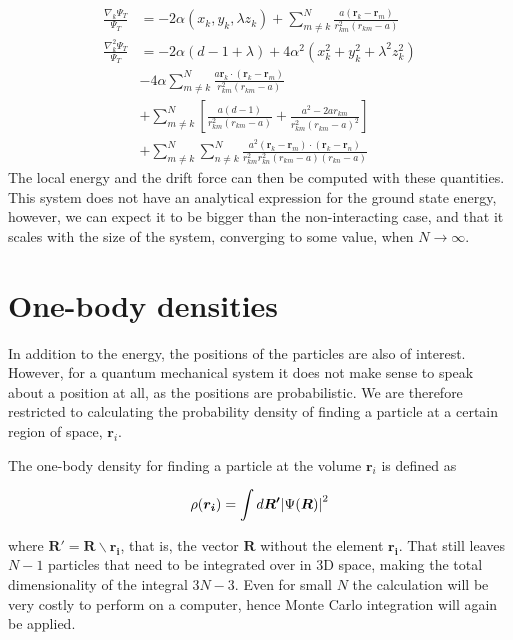 \documentclass[aps,reprint,superscriptaddress,nofootinbib]{revtex4-2}
\begin{document}
    \begin{align*}
        \frac{\nabla_k \Psi_T}{\Psi_T} &= -2 \alpha (x_k, y_k, \lambda z_k) + \sum_{m \neq k}^N \frac{a(\bm r_k - \bm r_m)}{r_{km}^2 (r_{km} - a)} \\
        \frac{\nabla_k^2 \Psi_T}{\Psi_T} &= -2 \alpha (d - 1 + \lambda) + 4 \alpha^2 (x_k^2 + y_k^2 + \lambda^2 z_k^2) \\
        &- 4 \alpha \sum_{m \neq k}^N \frac{a\bm r_k \cdot (\bm r_k - \bm r_m)}{r_{km}^2 (r_{km} - a)} \\
        &+ \sum_{m \neq k}^N \left[ \frac{a(d - 1)}{r_{km}^2 (r_{km} - a)} + \frac{a^2 - 2 a r_{km}}{r_{km}^2 (r_{km} - a)^2} \right] \\
        &+ \sum_{m \neq k}^N \sum_{n \neq k}^N \frac{a^2(\bm r_k - \bm r_m) \cdot (\bm r_k - \bm r_n)}{r_{km}^2 r_{kn}^2 (r_{km} - a)(r_{kn} - a)}
    \end{align*}
    The local energy and the drift force can then be computed with these quantities. This system does not have an analytical expression for the ground state energy, however, we can expect it to be bigger than the non-interacting case, and that it scales with the size of the system, converging to some value, when \(N \rightarrow \infty\). 
    
\section*{One-body densities}
    
    In addition to the energy, the positions of the particles are also of interest. However, for a quantum mechanical system it does not make sense to speak about a position at all, as the positions are probabilistic. We are therefore restricted to calculating the probability density of finding a particle at a certain region of space, \(\bm r_i\).
    
    The one-body density for finding a particle at the volume \(\bm r_i\) is defined as
    
    \begin{equation} \label{eq:one_body}
        \rho(\bm{r_i}) = \int d\bm{R'}\abs{\Psi(\bm R)}^2
    \end{equation}
    
    where \(\bm{R'} = \bm R \backslash \bm{r_i}\), that is, the vector \(\bm R\) without the element \(\bm{r_i}\). That still leaves \(N-1\) particles that need to be integrated over in 3D space, making the total dimensionality of the integral \(3N - 3\). Even for small \(N\) the calculation will be very costly to perform on a computer, hence Monte Carlo integration will again be applied.
    
\end{document}
